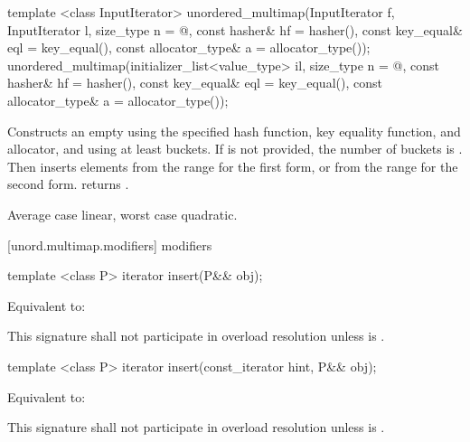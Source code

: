 %
\begin{itemdecl}
template <class InputIterator>
  unordered_multimap(InputIterator f, InputIterator l,
                     size_type n = @\seebelow@,
                     const hasher& hf = hasher(),
                     const key_equal& eql = key_equal(),
                     const allocator_type& a = allocator_type());
unordered_multimap(initializer_list<value_type> il,
                   size_type n = @\seebelow@,
                   const hasher& hf = hasher(),
                   const key_equal& eql = key_equal(),
                   const allocator_type& a = allocator_type());
\end{itemdecl}

\begin{itemdescr}
\pnum
\effects Constructs an empty  using the
specified hash function, key equality function, and allocator, and
using at least  buckets. If  is not
provided, the number of buckets is . Then
inserts elements from the range 
for the first form, or from the range 
 for the second form.
 returns .

\pnum
\complexity Average case linear, worst case quadratic.
\end{itemdescr}

[unord.multimap.modifiers]{ modifiers}

%
\begin{itemdecl}
template <class P>
  iterator insert(P&& obj);
\end{itemdecl}

\begin{itemdescr}
\pnum
\effects Equivalent to: 

\pnum
\remarks This signature shall not participate in overload resolution
unless  is .
\end{itemdescr}

%
\begin{itemdecl}
template <class P>
  iterator insert(const_iterator hint, P&& obj);
\end{itemdecl}

\begin{itemdescr}
\pnum
\effects Equivalent to:

\pnum
\remarks This signature shall not participate in overload resolution
unless  is .
\end{itemdescr}

